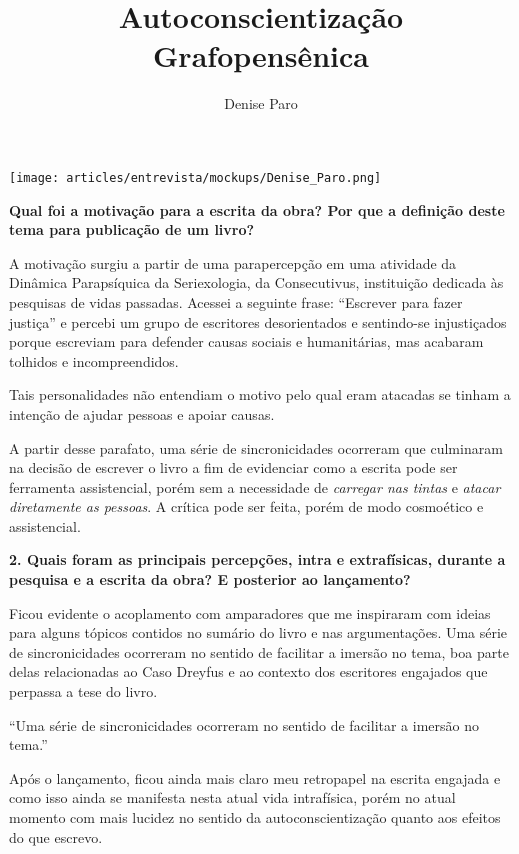 \documentclass{gescons}
\author{Denise Paro}
\title{Autoconscientização Grafopensênica}
\begin{document}
    \makeentrevistatitle

    \begin{multicols}{2}

\begin{center}
    \texttt{[image: articles/entrevista/mockups/Denise\_Paro.png]}
\end{center}

\textbf{Qual foi a motivação para a escrita da obra? Por que a definição deste tema para publicação de um livro?}

A motivação surgiu a partir de uma parapercepção em uma atividade da
Dinâmica Parapsíquica da Seriexologia, da Consecutivus, instituição
dedicada às pesquisas de vidas passadas. Acessei a seguinte frase:
``Escrever para fazer justiça'' e percebi um grupo de escritores
desorientados e sentindo-se injustiçados porque escreviam para defender
causas sociais e humanitárias, mas acabaram tolhidos e incompreendidos.

Tais personalidades não entendiam o motivo pelo qual eram atacadas se
tinham a intenção de ajudar pessoas e apoiar causas.

A partir desse parafato, uma série de sincronicidades ocorreram que
culminaram na decisão de escrever o livro a fim de evidenciar como a
escrita pode ser ferramenta assistencial, porém sem a necessidade de
\emph{carregar nas tintas} e \emph{atacar diretamente as pessoas}. A
crítica pode ser feita, porém de modo cosmoético e assistencial.

\textbf{2. Quais foram as principais percepções, intra e extrafísicas, durante a pesquisa e a escrita da obra? E posterior ao lançamento?}

Ficou evidente o acoplamento com amparadores que me inspiraram com
ideias para alguns tópicos contidos no sumário do livro e nas
argumentações. Uma série de sincronicidades ocorreram no sentido de
facilitar a imersão no tema, boa parte delas relacionadas ao Caso
Dreyfus e ao contexto dos escritores engajados que perpassa a tese do
livro.

\begin{pullquote}
``Uma série de sincronicidades ocorreram no sentido de facilitar a imersão no tema.''
\end{pullquote}

Após o lançamento, ficou ainda mais claro meu retropapel na escrita
engajada e como isso ainda se manifesta nesta atual vida intrafísica,
porém no atual momento com mais lucidez no sentido da
autoconscientização quanto aos efeitos do que escrevo.


\end{multicols}
\end{document}

